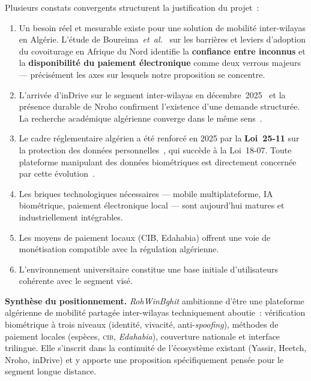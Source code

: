 \documentclass[12pt, a4paper, oneside]{report}
\begin{document}
Plusieurs constats convergents structurent la justification du projet~:
\begin{enumerate}
  \item Un besoin réel et mesurable existe pour une solution de mobilité inter-wilayas en Algérie. L'étude de Boureima~\textit{et~al.}~\cite{mounir_carpooling_developing_2022} sur les barrières et leviers d'adoption du covoiturage en Afrique du Nord identifie la \textbf{confiance entre inconnus} et la \textbf{disponibilité du paiement électronique} comme deux verrous majeurs --- précisément les axes sur lesquels notre proposition se concentre.
  \item L'arrivée d'inDrive sur le segment inter-wilayas en décembre~2025~\cite{indrive_interwilaya_2025} et la présence durable de Nroho confirment l'existence d'une demande structurée. La recherche académique algérienne converge dans le même sens~\cite{bouzidi_covoiturage_dz_2022}.
  \item Le cadre réglementaire algérien a été renforcé en 2025 par la \textbf{Loi~25-11} sur la protection des données personnelles~\cite{loi2511_2025}, qui succède à la Loi~18-07. Toute plateforme manipulant des données biométriques est directement concernée par cette évolution~\cite{anpdp_obligations_2026}.
  \item Les briques technologiques nécessaires --- mobile multiplateforme, IA biométrique, paiement électronique local --- sont aujourd'hui matures et industriellement intégrables.
  \item Les moyens de paiement locaux (CIB, Edahabia) offrent une voie de monétisation compatible avec la régulation algérienne.
  \item L'environnement universitaire constitue une base initiale d'utilisateurs cohérente avec le segment visé.
\end{enumerate}

\begin{highlight}
\textbf{Synthèse du positionnement.} \textit{RohWinBghit} ambitionne d'être une plateforme algérienne de mobilité partagée inter-wilayas techniquement aboutie~: vérification biométrique à trois niveaux (identité, vivacité, anti-\textit{spoofing}), méthodes de paiement locales (espèces, \textsc{cib}, \textit{Edahabia}), couverture nationale et interface trilingue. Elle s'inscrit dans la continuité de l'écosystème existant (Yassir, Heetch, Nroho, inDrive) et y apporte une proposition spécifiquement pensée pour le segment longue distance.
\end{highlight}
\end{document}
